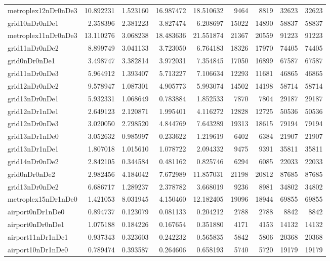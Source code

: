 \begin{longtable}{|l|r|r|r|r|r|r|r|r|}
metroplex12nDr0nDe3 & 10.892231 & 1.523160 & 16.987472 & 18.510632 & 9464 & 8819 & 32623 & 32623 \\
grid10nDr0nDe1 & 2.358396 & 2.381223 & 3.827474 & 6.208697 & 15022 & 14890 & 58837 & 58837 \\
metroplex11nDr0nDe3 & 13.110276 & 3.068238 & 18.483636 & 21.551874 & 21367 & 20559 & 91223 & 91223 \\
grid11nDr0nDe2 & 8.899749 & 3.041133 & 3.723050 & 6.764183 & 18326 & 17970 & 74405 & 74405 \\
grid0nDr0nDe1 & 3.498747 & 3.382814 & 3.972031 & 7.354845 & 17050 & 16899 & 67587 & 67587 \\
grid11nDr0nDe3 & 5.964912 & 1.393407 & 5.713227 & 7.106634 & 12293 & 11681 & 46865 & 46865 \\
grid12nDr0nDe2 & 9.578947 & 1.087301 & 4.905773 & 5.993074 & 14502 & 14198 & 58714 & 58714 \\
grid13nDr0nDe1 & 5.932331 & 1.068649 & 0.783884 & 1.852533 & 7870 & 7804 & 29187 & 29187 \\
grid12nDr1nDe1 & 2.649123 & 2.120871 & 1.995401 & 4.116272 & 12828 & 12725 & 50536 & 50536 \\
grid12nDr0nDe3 & 3.020050 & 2.798520 & 4.844769 & 7.643289 & 19313 & 18615 & 79194 & 79194 \\
grid13nDr1nDe0 & 3.052632 & 0.985997 & 0.233622 & 1.219619 & 6402 & 6384 & 21907 & 21907 \\
grid13nDr1nDe1 & 1.807018 & 1.015610 & 1.078722 & 2.094332 & 9475 & 9391 & 35811 & 35811 \\
grid14nDr0nDe2 & 2.842105 & 0.344584 & 0.481162 & 0.825746 & 6294 & 6085 & 22033 & 22033 \\
grid0nDr0nDe2 & 2.982456 & 4.184042 & 7.672989 & 11.857031 & 21198 & 20812 & 87685 & 87685 \\
grid13nDr0nDe2 & 6.686717 & 1.289237 & 2.378782 & 3.668019 & 9236 & 8981 & 34802 & 34802 \\
metroplex15nDr1nDe0 & 1.421053 & 8.031945 & 4.150460 & 12.182405 & 19096 & 18944 & 69855 & 69855 \\
airport0nDr1nDe0 & 0.894737 & 0.123079 & 0.081133 & 0.204212 & 2788 & 2788 & 8842 & 8842 \\
airport0nDr0nDe1 & 1.075188 & 0.184226 & 0.167654 & 0.351880 & 4171 & 4153 & 14132 & 14132 \\
airport11nDr1nDe1 & 0.937343 & 0.323603 & 0.242232 & 0.565835 & 5842 & 5806 & 20368 & 20368 \\
airport10nDr1nDe0 & 0.789474 & 0.393587 & 0.264606 & 0.658193 & 5740 & 5720 & 19179 & 19179 \\

\end{longtable}
